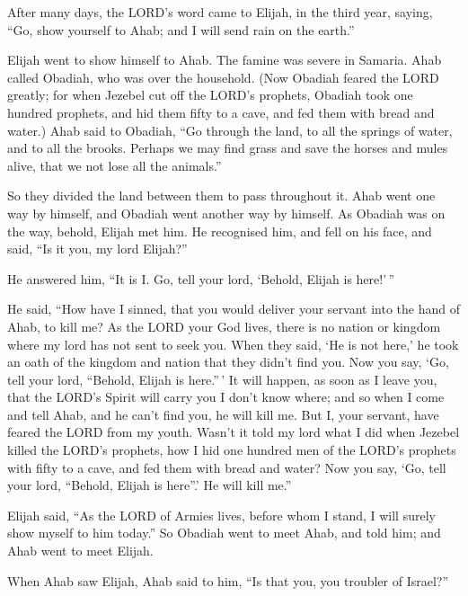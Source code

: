 After many days, the LORD's word came to Elijah, in the
third year, saying, ``Go, show yourself to Ahab; and I will send rain on
the earth.''

 Elijah went to show himself to Ahab. The famine was severe
in Samaria.  Ahab called Obadiah, who was over the
household. (Now Obadiah feared the LORD greatly;  for when
Jezebel cut off the LORD's prophets, Obadiah took one hundred prophets,
and hid them fifty to a cave, and fed them with bread and water.)
 Ahab said to Obadiah, ``Go through the land, to all the
springs of water, and to all the brooks. Perhaps we may find grass and
save the horses and mules alive, that we not lose all the animals.''

 So they divided the land between them to pass throughout
it. Ahab went one way by himself, and Obadiah went another way by
himself.  As Obadiah was on the way, behold, Elijah met him.
He recognised him, and fell on his face, and said, ``Is it you, my lord
Elijah?''

 He answered him, ``It is I. Go, tell your lord, `Behold,
Elijah is here!'\,''

 He said, ``How have I sinned, that you would deliver your
servant into the hand of Ahab, to kill me?  As the LORD
your God lives, there is no nation or kingdom where my lord has not sent
to seek you. When they said, `He is not here,' he took an oath of the
kingdom and nation that they didn't find you.  Now you say,
`Go, tell your lord, ``Behold, Elijah is here.''\,'  It
will happen, as soon as I leave you, that the LORD's Spirit will carry
you I don't know where; and so when I come and tell Ahab, and he can't
find you, he will kill me. But I, your servant, have feared the LORD
from my youth.  Wasn't it told my lord what I did when
Jezebel killed the LORD's prophets, how I hid one hundred men of the
LORD's prophets with fifty to a cave, and fed them with bread and water?
 Now you say, `Go, tell your lord, ``Behold, Elijah is
here''.' He will kill me.''

 Elijah said, ``As the LORD of Armies lives, before whom I
stand, I will surely show myself to him today.''  So
Obadiah went to meet Ahab, and told him; and Ahab went to meet Elijah.

 When Ahab saw Elijah, Ahab said to him, ``Is that you, you
troubler of Israel?''

